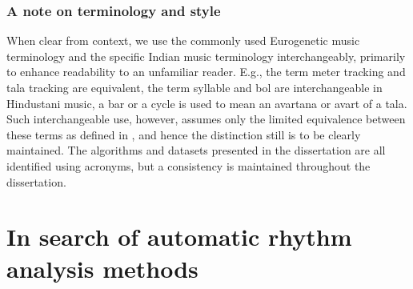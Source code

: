 \subsubsection{A note on terminology and style}
%
When clear from context, we use the commonly used Eurogenetic music terminology and the specific Indian music terminology interchangeably, primarily to enhance readability to an unfamiliar reader. E.g., the term meter tracking and \gls{tala} tracking are equivalent, the term syllable and \gls{bol} are interchangeable in Hindustani music, a bar or a cycle is used to mean an \gls{avartana} or \gls{avart} of a \gls{tala}. Such interchangeable use, however, assumes only the limited equivalence between these terms as defined in , and hence the distinction still is to be clearly maintained. The algorithms and datasets presented in the dissertation are all identified using acronyms, but a consistency is maintained throughout the dissertation. %
%
\section[In search of automatic rhythm analysis methods]{In search of automatic rhythm\\ analysis methods}

%

